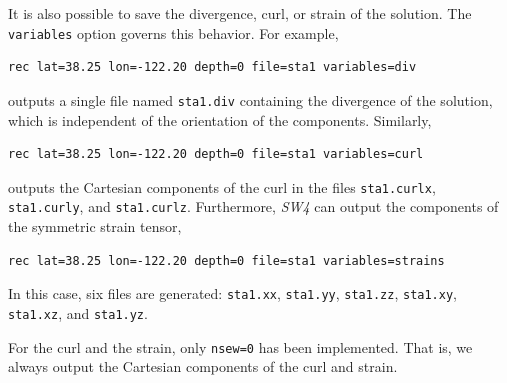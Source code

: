 \documentclass[11pt]{report}
\begin{document}
It is also possible to save the divergence, curl, or strain of the solution. The {\tt variables}
option governs this behavior. For example,
\begin{verbatim}
rec lat=38.25 lon=-122.20 depth=0 file=sta1 variables=div
\end{verbatim}
outputs a single file named {\tt sta1.div} containing the divergence of the solution, which is
independent of the orientation of the components. Similarly,
\begin{verbatim}
rec lat=38.25 lon=-122.20 depth=0 file=sta1 variables=curl
\end{verbatim}
outputs the Cartesian components of the curl in the files {\tt sta1.curlx}, {\tt sta1.curly}, and
{\tt sta1.curlz}. Furthermore, \emph{SW4} can output the components of the symmetric strain tensor,
\begin{verbatim}
rec lat=38.25 lon=-122.20 depth=0 file=sta1 variables=strains
\end{verbatim}
In this case, six files are generated: {\tt sta1.xx}, {\tt sta1.yy}, {\tt sta1.zz}, {\tt sta1.xy},
{\tt sta1.xz}, and {\tt sta1.yz}.

For the curl and the strain, only \verb+nsew=0+ has been implemented. That is, we always output the
Cartesian components of the curl and strain.

\end{document}
